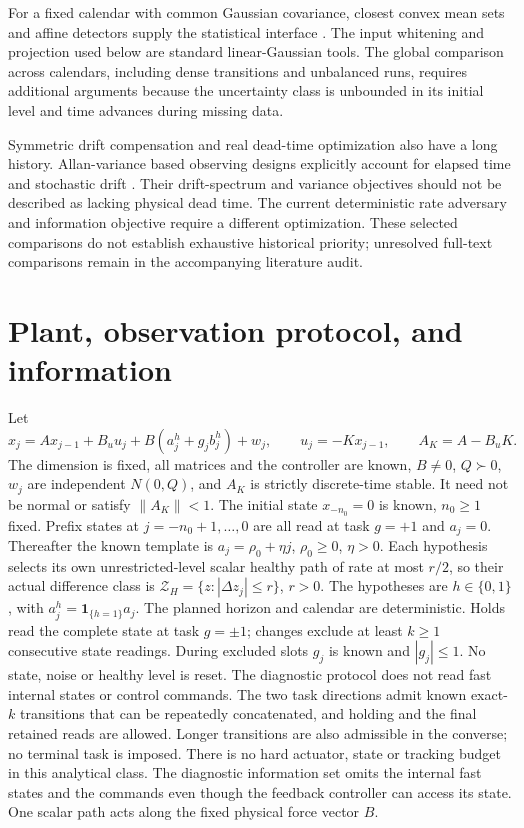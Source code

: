 \documentclass[11pt]{article}
\begin{document}
For a fixed calendar with common Gaussian covariance, closest convex mean sets
and affine detectors supply the statistical interface \cite{convex}.
The input whitening and projection used below are standard linear-Gaussian
tools. The global comparison across calendars, including dense transitions
and unbalanced runs, requires additional arguments because the uncertainty
class is unbounded in its initial level and time advances during missing data.

Symmetric drift compensation and real dead-time optimization also have a long
history. Allan-variance based observing designs explicitly account for elapsed
time and stochastic drift \cite{allan}.
Their drift-spectrum and variance objectives should not be described as lacking
physical dead time. The current deterministic rate adversary and information
objective require a different optimization. These selected comparisons do not
establish exhaustive historical priority; unresolved full-text comparisons remain
in the accompanying literature audit.

\section{Plant, observation protocol, and information}
Let
\[
x_j=A x_{j-1}+B_u u_j+B(a_j^h+g_j b_j^h)+w_j,\qquad
u_j=-Kx_{j-1},\qquad A_K=A-B_uK .
\]
The dimension is fixed, all matrices and the controller are known,
$B\ne0$, $Q\succ0$, $w_j$ are independent $N(0,Q)$, and $A_K$ is strictly
discrete-time stable. It need not be normal or satisfy $\|A_K\|<1$.
The initial state $x_{-n_0}=0$ is known, $n_0\ge1$ fixed.
Prefix states at $j=-n_0+1,\ldots,0$ are all read at task $g=+1$ and
$a_j=0$. Thereafter the known template is $a_j=\rho_0+\eta j$,
$\rho_0\ge0$, $\eta>0$. Each hypothesis selects its own unrestricted-level
scalar healthy path of rate at most $r/2$, so their actual difference class
is $\mathcal Z_H=\{z:|\Delta z_j|\le r\}$, $r>0$.
The hypotheses are $h\in\{0,1\}$, with $a_j^h=\mathbf1_{\{h=1\}}a_j$.
The planned horizon and calendar are deterministic. Holds read the complete
state at task $g=\pm1$; changes exclude at least $k\ge1$ consecutive state
readings. During excluded slots $g_j$ is known and $|g_j|\le1$.
No state, noise or healthy level is reset.
The diagnostic protocol does not read fast internal states or control commands.
The two task directions admit known exact-$k$ transitions that can be repeatedly
concatenated, and holding and the final retained reads are allowed.
Longer transitions are also admissible in the converse; no terminal task is imposed.
There is no hard actuator, state or tracking budget in this analytical class.
The diagnostic information set omits the internal fast states and the commands
even though the feedback controller can access its state.
One scalar path acts along the fixed physical force vector $B$.
\end{document}
